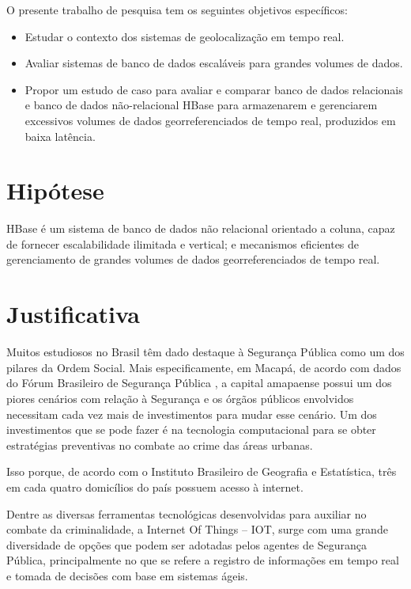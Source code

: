 O presente trabalho de pesquisa tem os seguintes objetivos específicos:

\begin{itemize}
	\item Estudar o contexto dos sistemas de geolocalização em tempo real.
	\item Avaliar sistemas de banco de dados escaláveis para grandes volumes de dados.
	\item Propor um estudo de caso para avaliar e comparar banco de dados relacionais e banco de dados não-relacional HBase para armazenarem e gerenciarem excessivos volumes de dados georreferenciados de tempo real, produzidos em baixa latência.
	 
\end{itemize}

\section {Hipótese}

HBase é um sistema de banco de dados não relacional orientado a coluna, capaz de fornecer escalabilidade ilimitada e vertical; e mecanismos eficientes de gerenciamento de grandes volumes de dados georreferenciados de tempo real.

\section {Justificativa}
Muitos estudiosos no Brasil têm dado destaque à Segurança Pública como um dos pilares da Ordem Social. Mais especificamente, em Macapá, de acordo com dados do Fórum Brasileiro de Segurança Pública \cite{forumdeseguranca:2018}, a capital amapaense possui um dos piores cenários com relação à Segurança e os órgãos públicos envolvidos necessitam cada vez mais de investimentos para mudar esse cenário. Um dos investimentos que se pode fazer é na tecnologia computacional para se obter estratégias preventivas no combate ao crime das áreas urbanas.

Isso porque, de acordo com o Instituto Brasileiro de Geografia e Estatística, três em cada quatro domicílios do país possuem acesso à internet\cite{IBGE-2018}.

Dentre as diversas ferramentas tecnológicas desenvolvidas para auxiliar no combate da criminalidade, a Internet Of Things -- IOT, surge com uma grande diversidade de opções que podem ser adotadas pelos agentes de Segurança Pública, principalmente no que se refere a registro de informações em tempo real e tomada de decisões com base em sistemas ágeis.


